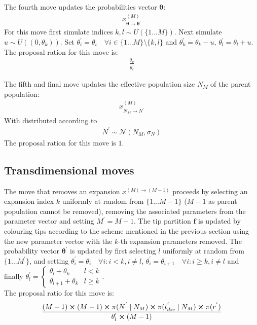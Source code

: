 \documentclass{report}
\theoremstyle{definition}
\begin{document}
The fourth move updates the probabilities vector $\pmb \theta$:
\begin{gather}
  x^{(M)}_{\pmb\theta\to \pmb\theta^{'}}
\end{gather}
For this move first simulate indices $k, l\sim U(\{1...M\})$. Next simulate $u\sim U((0, \theta_k))$. Set $\theta^{'}_i = \theta_i \quad\forall i \in \{1...M\}\setminus\{k,l\}$ and $\theta^{'}_k = \theta_k-u$, $\theta^{'}_l = \theta_l+u$.\\
The proposal ration for this move is:
\begin{gather}
\frac{\theta_k}{\theta^{'}_l}
\end{gather}

The fifth and final move updates the effective population size $N_M$ of the parent population:
\begin{gather}
x^{(M)}_{N_M\to N^{'}}
\end{gather}
With distributed according to
\begin{gather}
N^{'}\sim \mathcal{N}(N_M, \sigma_N)
\end{gather}
The proposal ration for this move is $1$.
\subsection{Transdimensional moves}
The move that removes an expansion $x^{(M)\to(M-1)}$ proceeds by selecting an expansion index $k$ uniformly at random from $\{1...M-1\}$ ($M-1$ as parent population cannot be removed), removing the associated parameters from the parameter vector and setting $M^{'} = M-1$. The tip partition $\mathbf{f}$ is updated by colouring tips according to the scheme mentioned in the previous section using the new parameter vector with the $k$-th expansion parameters removed. The probability vector $\pmb\theta^{'}$ is updated by first selecting $l$ uniformly at random from $\{1...M^{'}\}$, and setting $\theta^{'}_i = \theta_i\quad \forall i:i<k,i\neq l$, $\theta^{'}_i = \theta_{i+1}\quad \forall i:i\geq k,i\neq l$ and finally $\theta^{'}_l = 
  \begin{cases} 
      \theta_l+\theta_k & l < k \\
      \theta_{l+1}+\theta_k & l \geq k
  \end{cases}$.\\
The proposal ratio for this move is:
\begin{gather}
\frac{(M-1)\cross(M-1)\cross\pi(N^{'}\mid N_{M})\cross\pi(t^{'}_{div}\mid N_{M})\cross\pi(r^{'})}{\theta^{'}_l\cross(M-1)}
\end{gather}
\end{document}
